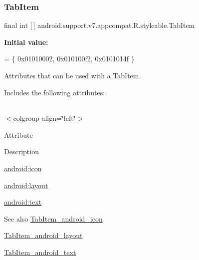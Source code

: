 \subsubsection{\texorpdfstring{Tab\+Item}{TabItem}}
{\footnotesize\ttfamily final int \mbox{[}$\,$\mbox{]} android.\+support.\+v7.\+appcompat.\+R.\+styleable.\+Tab\+Item\hspace{0.3cm}{\ttfamily [static]}}

{\bfseries Initial value\+:}
\begin{DoxyCode}
= \{
            0x01010002, 0x010100f2, 0x0101014f
        \}
\end{DoxyCode}
Attributes that can be used with a Tab\+Item. 

Includes the following attributes\+:

\tabulinesep=1mm
\begin{longtabu} spread 0pt [c]{*{0}{|X[-1]}|}
\hline
\end{longtabu}
$<$colgroup align=\char`\"{}left\char`\"{}$>$ 

Attribute

Description 

{\ttfamily \hyperlink{classandroid_1_1support_1_1v7_1_1appcompat_1_1R_1_1styleable_a5beb46e28b591f7a939c569653d442f1}{android\+:icon}}

{\ttfamily \hyperlink{classandroid_1_1support_1_1v7_1_1appcompat_1_1R_1_1styleable_af67b494fa3cd9c41f653f980b03f2842}{android\+:layout}}

{\ttfamily \hyperlink{classandroid_1_1support_1_1v7_1_1appcompat_1_1R_1_1styleable_a59c1aa999efd1466edb691855094aaec}{android\+:text}}

\begin{DoxySeeAlso}{See also}
\hyperlink{classandroid_1_1support_1_1v7_1_1appcompat_1_1R_1_1styleable_a5beb46e28b591f7a939c569653d442f1}{Tab\+Item\+\_\+android\+\_\+icon} 

\hyperlink{classandroid_1_1support_1_1v7_1_1appcompat_1_1R_1_1styleable_af67b494fa3cd9c41f653f980b03f2842}{Tab\+Item\+\_\+android\+\_\+layout} 

\hyperlink{classandroid_1_1support_1_1v7_1_1appcompat_1_1R_1_1styleable_a59c1aa999efd1466edb691855094aaec}{Tab\+Item\+\_\+android\+\_\+text} 
\end{DoxySeeAlso}
\mbox{\label{classandroid_1_1support_1_1v7_1_1appcompat_1_1R_1_1styleable_a5beb46e28b591f7a939c569653d442f1}} 
